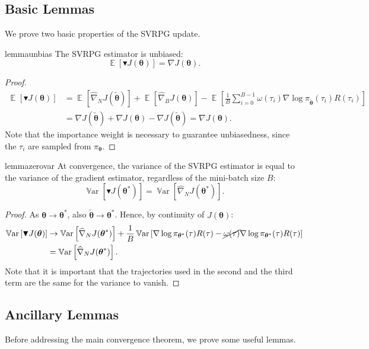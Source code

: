 \documentclass{article}
\theoremstyle{remark}
\theoremstyle{definition}
\DeclareMathOperator*{\EV}{\mathbb{E}}
\DeclareMathOperator*{\Var}{\mathbb{V}ar}
\newcommand{\EVV}[2][\ppvect \in \ppspace]{\EV_{#1}\left[{#2}\right]}
\newcommand{\vtheta}{\boldsymbol{\theta}}
\newcommand{\score}[2]{\nabla\log\pi_{#1}(#2)}
\newcommand{\gradJ}[1]{\nabla J(#1)}
\newcommand{\gradApp}[2]{\widehat{\nabla}_{#2}J(#1)}
\newcommand{\gradBlack}[1]{\blacktriangledown J(#1)}
\begin{document}
\subsection*{Basic Lemmas}
We prove two basic properties of the SVRPG update.

\begin{restatable}{lemma}{unbias}\label{lemma:unbias}
The SVRPG estimator is unbiased:
\[
\mathop{\mathbb{E}}
\left[\blacktriangledown J(\vtheta)\right] = \gradJ{\vtheta}.
\]
\end{restatable}
\begin{proof}
\begin{align*}
\EVV[]{\gradBlack{\vtheta}} &= \EVV[]{\gradApp{\tilde{\vtheta}}{N}}  + \EVV[]{\gradApp{\vtheta}{B}} - \EVV[]{\frac{1}{B}\sum_{i=0}^{B-1}\omega(\tau_i)\score{\tilde{\vtheta}}{\tau_i}R(\tau_i)} \\
&= \gradJ{\tilde{\vtheta}} + \gradJ{\vtheta} - \gradJ{\tilde{\vtheta}} = \gradJ{\vtheta}.
\end{align*}
Note that the importance weight is necessary to guarantee unbiasedness, since the $\tau_i$ are sampled from $\pi_{\vtheta}$.
\end{proof}

\begin{restatable}{lemma}{zerovar}\label{lemma:zerovar}
At convergence, the variance of the SVRPG estimator is equal to the variance of the gradient estimator, regardless of the mini-batch size $B$:
\[
	\Var\left[\gradBlack{\vtheta^*}\right] = 
	\Var\left[\gradApp{\vtheta^*}{N}\right].
\]
\end{restatable}
\begin{proof}
As $\vtheta\to\vtheta^*$, also $\tilde{\vtheta}\to\vtheta^*$. Hence, by continuity of $J(\vtheta)$:
\begin{align*}
\Var\left[\gradBlack{\vtheta}\right] &\to \Var\left[\gradApp{\vtheta^*}{N}\right] + \frac{1}{B}\Var\left[\score{\vtheta^*}{\tau}R(\tau) - \cancel{\omega(\tau)}\score{\vtheta^*}{\tau}R(\tau)\right] \\
&= \Var\left[\gradApp{\vtheta^*}{N}\right].
\end{align*}
Note that it is important that the trajectories used in the second and the third term are the same for the variance to vanish.
\end{proof}

\subsection*{Ancillary Lemmas}
Before addressing the main convergence theorem, we prove some useful lemmas.
\end{document}
